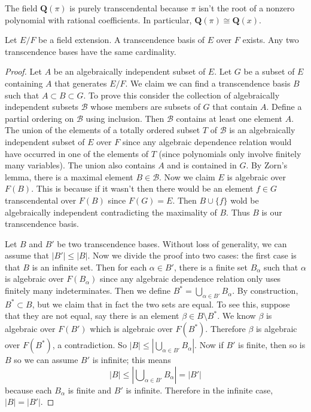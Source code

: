 \begin{example}
\label{example-pi-transcendental}
The field $\mathbf{Q}(\pi)$ is purely transcendental because
$\pi$ isn't the root of a nonzero polynomial with rational coefficients.
In particular, $\mathbf{Q}(\pi) \cong \mathbf{Q}(x)$.
\end{example}

\begin{lemma}
\label{lemma-transcendence-degree}
Let $E/F$ be a field extension. A transcendence basis of $E$ over $F$ exists.
Any two transcendence bases have the same cardinality.
\end{lemma}

\begin{proof}
Let $A$ be an algebraically independent subset of $E$. Let $G$ be a subset
of $E$ containing $A$ that generates $E/F$. We claim we can find a
transcendence basis $B$ such that $A \subset B \subset G$.
To prove this consider the collection of algebraically independent subsets
$\mathcal{B}$ whose members are subsets of $G$ that contain $A$.
Define a partial ordering on $\mathcal{B}$ using inclusion.
Then $\mathcal{B}$ contains at least one element $A$.
The union of the elements of a totally ordered subset $T$ of $\mathcal{B}$
is an algebraically independent subset of $E$ over $F$ since any algebraic
dependence relation would have occurred in one of the elements of $T$
(since polynomials only involve finitely many variables). The union also
contains $A$ and is contained in $G$. By Zorn's lemma, there is a maximal
element $B \in \mathcal{B}$. Now we claim $E$ is algebraic over $F(B)$.
This is because if it wasn't then there would be an element
$f \in G$ transcendental over $F(B)$ since $F(G) = E$. Then
$B \cup\{f\}$ wold be algebraically independent contradicting the
maximality of $B$. Thus $B$ is our transcendence basis.

\medskip\noindent
Let $B$ and $B'$ be two transcendence bases. Without loss of generality, we
can assume that $|B'| \leq |B|$. Now we divide the proof into two cases: the
first case is that $B$ is an infinite set. Then for each $\alpha \in B'$,
there is a finite set $B_{\alpha}$ such that $\alpha$ is algebraic over
$F(B_{\alpha})$ since any algebraic dependence relation only uses finitely many
indeterminates. Then we define $B^* = \bigcup_{\alpha\in B'} B_{\alpha}$.
By construction, $B^* \subset B$, but we claim that in fact the two sets are
equal. To see this, suppose that they are not equal, say there is an element
$\beta \in B \setminus B^*$. We know $\beta$ is algebraic over $F(B')$ which
is algebraic over $F(B^*)$. Therefore $\beta$ is algebraic over $F(B^*)$, a
contradiction. So $|B| \leq |\bigcup_{\alpha \in B'} B_{\alpha}|$.
Now if $B'$ is finite, then so is $B$ so we can assume $B'$ is infinite;
this means
$$
|B| \leq |\bigcup\nolimits_{\alpha \in B'} B_{\alpha}| = |B'|
$$
because each $B_\alpha$ is finite and $B'$ is infinite. Therefore in the
infinite case, $|B| = |B'|$.


\end{proof}
